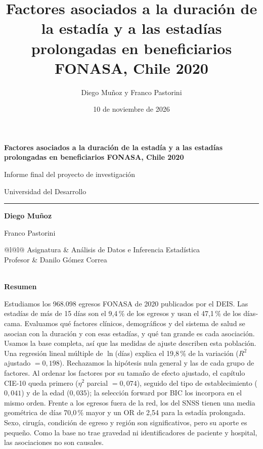 \documentclass[10.5pt,a4paper,headings=small,abstract=false,bibliography=totoc,listof=totoc]{scrartcl}
\title{Factores asociados a la duración de la estadía y a las estadías prolongadas en beneficiarios FONASA, Chile 2020}
\author{Diego Muñoz y Franco Pastorini}
\date{10 de noviembre de 2026}
\newcommand{\cie}{\mbox{CIE-10}}
\newcommand{\pct}{\,\%}
\begin{document}
\begin{titlepage}
\thispagestyle{plain}
\raggedright
\vspace*{5.5cm}
{\sffamily\bfseries\color{acento}\fontsize{24}{29}\selectfont Factores asociados a la duración de la estadía y a las estadías prolongadas en beneficiarios FONASA, Chile 2020\par}
\vspace{1.2em}
{\color{gris}\large Informe final del proyecto de investigación\par}
\vspace{0.3em}
{\color{gris}\large Universidad del Desarrollo\par}
\vspace{0.8em}
{\color{filete}\rule{\textwidth}{0.6pt}}\par
\vfill
{\sffamily\bfseries\large Diego Muñoz\par Franco Pastorini\par}
\vspace{1.4em}
{\small
\begin{tabular}{@{}l@{\hspace{1.2em}}l@{}}
\color{gris}Asignatura & Análisis de Datos e Inferencia Estadística \\
\color{gris}Profesor & Danilo Gómez Correa \\
 \\
\end{tabular}\par}
\vspace{1cm}
\end{titlepage}
\setcounter{page}{2}

{\sffamily\bfseries\color{acento}\Large Resumen}\par\vspace{0.6em}
Estudiamos los 968.098 egresos FONASA de 2020 publicados por el DEIS. Las estadías de más de 15 días son el 9,4\pct{} de los egresos y usan el 47,1\pct{} de los días-cama. Evaluamos qué factores clínicos, demográficos y del sistema de salud se asocian con la duración y con esas estadías, y qué tan grande es cada asociación. Usamos la base completa, así que las medidas de ajuste describen esta población. Una regresión lineal múltiple de $\ln$(días) explica el 19,8\pct{} de la variación ($R^2$ ajustado $=0{,}198$). Rechazamos la hipótesis nula general y las de cada grupo de factores. Al ordenar los factores por su tamaño de efecto ajustado, el capítulo \cie{} queda primero ($\eta^2$ parcial $=0{,}074$), seguido del tipo de establecimiento ($0{,}041$) y de la edad ($0{,}035$); la selección forward por BIC los incorpora en el mismo orden. Frente a los egresos fuera de la red, los del SNSS tienen una media geométrica de días 70,0\pct{} mayor y un OR de 2,54 para la estadía prolongada. Sexo, cirugía, condición de egreso y región son significativos, pero su aporte es pequeño. Como la base no trae gravedad ni identificadores de paciente y hospital, las asociaciones no son causales.
\end{document}
